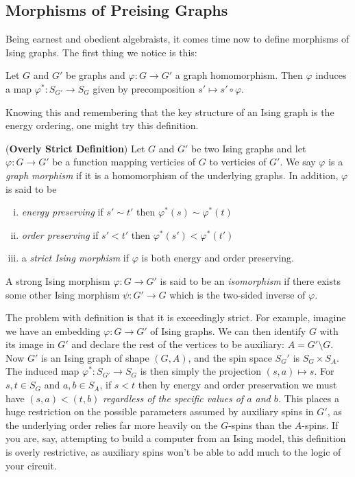 \subsection{Morphisms of Preising Graphs}
Being earnest and obedient algebraists, it comes time now to define morphisms of Ising graphs. The first thing we notice is this:
\begin{lem}\label{lem:spin-pullback}
	Let $G$ and $G'$ be graphs and $\varphi:G\to G'$ a graph homomorphism. Then $\varphi$ induces a map $\varphi^*:S_{G'}\to S_G$ given by precomposition $s' \mapsto s'\circ \varphi$.
\end{lem}
Knowing this and remembering that the key structure of an Ising graph is the energy ordering, one might try this definition.
\begin{defn}(\textbf{Overly Strict Definition})\label{defn:morphisms-of-Ising}
	Let $G$ and $G'$ be two Ising graphs and let $\varphi:G\to G'$ be a function mapping verticies of $G$ to verticies of $G'$. We say $\varphi$ is a \emph{graph morphism} if it is a homomorphism of the underlying graphs. In addition, $\varphi$ is said to be
	\begin{enumerate}[(i)]
		\item \emph{energy preserving} if $s' \sim t'$ then $\varphi^*(s) \sim \varphi^*(t)$
		\item \emph{order preserving} if $s' < t'$ then $\varphi^*(s') < \varphi^*(t')$
		\item a \emph{strict Ising morphism} if $\varphi$ is both energy and order preserving.
	\end{enumerate}
	A strong Ising morphism $\varphi:G\to G'$ is said to be an \emph{isomorphism} if there exists some other Ising morphism $\psi:G' \to G$ which is the two-sided inverse of $\varphi$.
\end{defn}

The problem with definition is that it is exceedingly strict. For example, imagine we have an embedding $\varphi:G\to G'$ of Ising graphs. We can then identify $G$ with its image in $G'$ and declare the rest of the vertices to be auxiliary: $A = G'\setminus G$. Now $G'$ is an Ising graph of shape $(G,A)$, and the spin space $S_G'$ is $S_G \times S_A$. The induced map $\varphi^*:S_{G'} \to S_G$ is then simply the projection $(s,a) \mapsto s$. For $s,t \in S_G$ and $a,b \in S_A$, if $s < t$ then by energy and order preservation we must have $(s,a) < (t,b)$ \emph{regardless of the specific values of $a$ and $b$.} This places a huge restriction on the possible parameters assumed by auxiliary spins in $G'$, as the underlying order relies far more heavily on the $G$-spins than the $A$-spins. If you are, say, attempting to build a computer from an Ising model, this definition is overly restrictive, as auxiliary spins won't be able to add much to the logic of your circuit.


